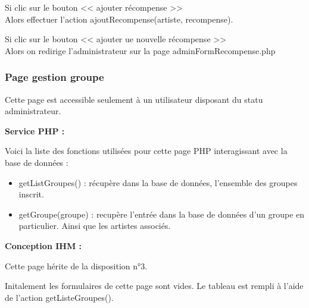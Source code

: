 \begin{paragraphe}
			\begin{paragraphe}
				Si clic sur le bouton << ajouter récompense >> \\
				Alors effectuer l'action ajoutRecompense(artiste, recompense).
			\end{paragraphe}

			\begin{paragraphe}
				Si clic sur le bouton << ajouter ue nouvelle récompense >> \\
				Alors on redirige l'administrateur sur la page adminFormRecompense.php
			\end{paragraphe}

			\begin{paragraphe}
			\end{paragraphe}

		\subsubsection{Page gestion groupe}

			\begin{paragraphe}
				Cette page est accessible seulement à un utilisateur disposant du statu administrateur.
			\end{paragraphe}

			\begin{paragraphe}
				\textbf{Service PHP :}
			\end{paragraphe}

			\begin{paragraphe}
				Voici la liste des fonctions utilisées pour cette page PHP interagissant avec la base de données :
			\end{paragraphe}

			\begin{paragraphe}
				\begin{itemize}
					\item getListGroupes() : récupère dans la base de données, l'ensemble des groupes inscrit.
					\item getGroupe(groupe) : recupère l'entrée dans la base de données d'un groupe en particulier. Ainsi que les artistes associés.
				\end{itemize}
			\end{paragraphe}

			\begin{paragraphe}
				\textbf{Conception IHM :}
			\end{paragraphe}

			\begin{paragraphe}
				Cette page hérite de la disposition n°3.\par
				Initalement les formulaires de cette page sont vides.
				Le tableau est rempli à l'aide de l'action getListeGroupes().
			\end{paragraphe}


\end{paragraphe}
